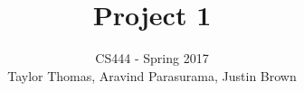 \documentclass[draftclsnofoot,onecolumn,10pt,compsoc]{IEEEtran}
\begin{document}
\begin{titlepage}
\title{Project 1}
\author{CS444 - Spring 2017 \\ Taylor Thomas, Aravind Parasurama, Justin Brown}
\maketitle
\begin{abstract}

\end{abstract}

\thispagestyle{empty} %

\end{titlepage}

\tableofcontents

\newpage
\end{document}
